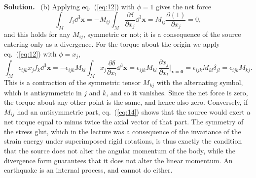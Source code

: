 \documentclass[a4paper,12pt]{paper}
\newenvironment{solution}{\par\noindent\textbf{Solution.}\ }{\par\medskip}
\begin{document}
\begin{solution}
(b) Applying eq.~(\ref{eq:12}) with $\phi=1$ gives the net force
\begin{equation}
\int_{M}f_{i}\dd^{3}\mathbf{x}
=-M_{ij}\int_{M}\frac{\partial\delta}{\partial x_{j}}\dd^{3}\mathbf{x}
=M_{ij}\frac{\partial(1)}{\partial x_{j}}=0,
\label{eq:13}
\end{equation}
and this holds for any $M_{ij}$, symmetric or not; it is a consequence of the source
entering only as a divergence. For the torque about the origin we apply
eq.~(\ref{eq:12}) with $\phi=x_{j}$,
\begin{equation}
\int_{M}\epsilon_{ijk}x_{j}f_{k}\dd^{3}\mathbf{x}
=-\epsilon_{ijk}M_{kl}\int_{M}x_{j}\frac{\partial\delta}{\partial x_{l}}\dd^{3}\mathbf{x}
=\epsilon_{ijk}M_{kl}\,\frac{\partial x_{j}}{\partial x_{l}}\bigg|_{\mathbf{x}=\mathbf{0}}
=\epsilon_{ijk}M_{kl}\delta_{jl}
=\epsilon_{ijk}M_{kj}.
\label{eq:14}
\end{equation}
This is a contraction of the symmetric tensor $M_{kj}$ with the alternating symbol, which
is antisymmetric in $j$ and $k$, and so it vanishes. Since the net force is zero, the
torque about any other point is the same, and hence also zero. Conversely, if
$M_{ij}$ had an antisymmetric part, eq.~(\ref{eq:14}) shows that the source would exert a
net torque equal to minus twice the axial vector of that part. The symmetry of the stress
glut, which in the lecture was a consequence of the invariance of the strain energy under
superimposed rigid rotations, is thus exactly the condition that the source does not alter
the angular momentum of the body, while the divergence form guarantees that it does not
alter the linear momentum. An earthquake is an internal process, and cannot do either.


\end{solution}
\end{document}

